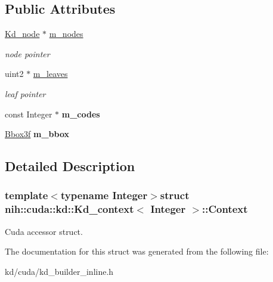 \subsection*{\-Public \-Attributes}
\begin{DoxyCompactItemize}
\item 
\hypertarget{structnih_1_1cuda_1_1kd_1_1_kd__context_1_1_context_a82eeadd4c088bf13e78355bfc41134aa}{
\hyperlink{structnih_1_1_kd__node}{\-Kd\-\_\-node} $\ast$ \hyperlink{structnih_1_1cuda_1_1kd_1_1_kd__context_1_1_context_a82eeadd4c088bf13e78355bfc41134aa}{m\-\_\-nodes}}
\label{structnih_1_1cuda_1_1kd_1_1_kd__context_1_1_context_a82eeadd4c088bf13e78355bfc41134aa}

\begin{DoxyCompactList}\small\item\em node pointer \end{DoxyCompactList}\item 
\hypertarget{structnih_1_1cuda_1_1kd_1_1_kd__context_1_1_context_a4e369bb8705ce44388d53643ed9613e5}{
uint2 $\ast$ \hyperlink{structnih_1_1cuda_1_1kd_1_1_kd__context_1_1_context_a4e369bb8705ce44388d53643ed9613e5}{m\-\_\-leaves}}
\label{structnih_1_1cuda_1_1kd_1_1_kd__context_1_1_context_a4e369bb8705ce44388d53643ed9613e5}

\begin{DoxyCompactList}\small\item\em leaf pointer \end{DoxyCompactList}\item 
\hypertarget{structnih_1_1cuda_1_1kd_1_1_kd__context_1_1_context_af478a955985701a3fa444764a51a11f1}{
const \-Integer $\ast$ {\bfseries m\-\_\-codes}}
\label{structnih_1_1cuda_1_1kd_1_1_kd__context_1_1_context_af478a955985701a3fa444764a51a11f1}

\item 
\hypertarget{structnih_1_1cuda_1_1kd_1_1_kd__context_1_1_context_a1bacaddbc8c7e61a1eb22694e8ea5cfc}{
\hyperlink{structnih_1_1_bbox}{\-Bbox3f} {\bfseries m\-\_\-bbox}}
\label{structnih_1_1cuda_1_1kd_1_1_kd__context_1_1_context_a1bacaddbc8c7e61a1eb22694e8ea5cfc}

\end{DoxyCompactItemize}


\subsection{\-Detailed \-Description}
\subsubsection*{template$<$typename Integer$>$struct nih\-::cuda\-::kd\-::\-Kd\-\_\-context$<$ Integer $>$\-::\-Context}

\-Cuda accessor struct. 

\-The documentation for this struct was generated from the following file\-:\begin{DoxyCompactItemize}
\item 
kd/cuda/kd\-\_\-builder\-\_\-inline.\-h\end{DoxyCompactItemize}
